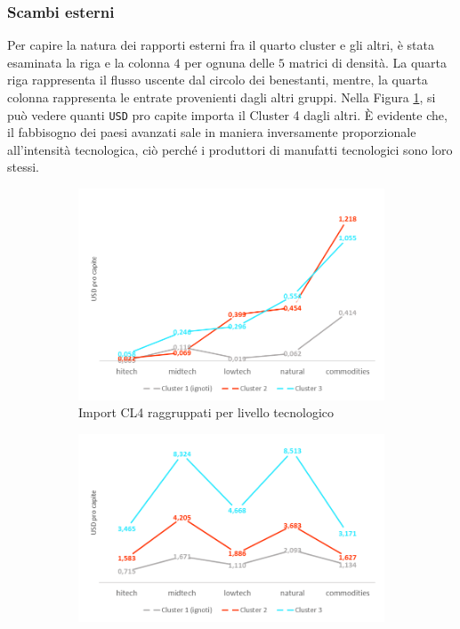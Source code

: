 \documentclass[]{article}
\begin{document}
\begin{multicols}{2}
	\subsubsection{Scambi esterni}
	Per capire la natura dei rapporti esterni fra il quarto cluster e gli altri, è stata esaminata la riga e la colonna $4$ per ognuna delle $5$ matrici di densità. La quarta riga rappresenta il flusso uscente dal circolo dei benestanti, mentre, la quarta colonna rappresenta le entrate provenienti dagli altri gruppi. Nella Figura \ref{fig:import-cl4}, si può vedere quanti \texttt{USD} pro capite importa il Cluster 4 dagli altri. È evidente che, il fabbisogno dei paesi avanzati sale in maniera inversamente proporzionale all'intensità tecnologica, ciò perché i produttori di manufatti tecnologici sono loro stessi. 
	\begin{figure}[th!]
		\centering
		\begin{subfigure}[b]{0.75\textwidth}
			\includegraphics[width=\textwidth]{img/cl4-import.png}
			\caption{Import CL4 raggruppati per livello tecnologico}
			\label{fig:import-cl4}
		\end{subfigure}
		\begin{subfigure}[b]{0.75\textwidth}
			\includegraphics[width=\textwidth]{img/cl4-export.png}

\end{subfigure}
\end{figure}
\end{multicols}
\end{document}
